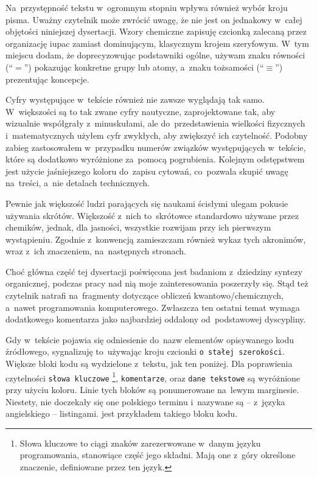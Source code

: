 Na~przystępność tekstu w~ogromnym stopniu wpływa również wybór kroju pisma.
Uważny czytelnik może zwrócić uwagę, że nie jest on jednakowy w~całej objętości
  niniejszej dysertacji.
Wzory chemiczne zapisuję czcionką zalecaną przez organizację \gls{iupac}
  zamiast dominującym, klasycznym krojem szeryfowym.
W~tym miejscu dodam, że doprecyzowując podstawniki ogólne,
  używam znaku równości (\enquote{$=$}) pokazując konkretne grupy lub atomy,
  a~znaku tożsamości (\enquote{$\equiv$}) prezentując koncepcje.

Cyfry występujące w~tekście również nie zawsze wyglądają tak samo.
W~większości są to tak zwane cyfry nautyczne, zaprojektowane tak, aby wizualnie współgrały
  z~minuskułami,
  ale do~przedstawienia wielkości fizycznych i~matematycznych użyłem cyfr zwykłych,
  aby zwiększyć ich czytelność.
Podobny zabieg zastosowałem w~przypadku numerów związków występujących w~tekście,
  które są dodatkowo wyróżnione za~pomocą pogrubienia.
Kolejnym odstępstwem jest użycie jaśniejszego koloru do~zapisu cytowań,
  co~pozwala skupić uwagę na~treści, a~nie detalach technicznych.

Pewnie jak większość ludzi parających się naukami ścisłymi ulegam pokusie używania skrótów.
Większość z~nich to~skrótowce standardowo używane przez chemików,
  jednak, dla jasności, wszystkie rozwijam przy ich pierwszym wystąpieniu.
Zgodnie z~konwencją zamieszczam również wykaz tych akronimów,
  wraz z~ich znaczeniem, na~następnych stronach.

Choć główna część tej dysertacji poświęcona jest badaniom z~dziedziny syntezy organicznej,
  podczas pracy nad nią moje zainteresowania poszerzyły się.
Stąd też czytelnik natrafi na~fragmenty dotyczące obliczeń kwantowo\-/chemicznych,
  a~nawet programowania komputerowego.
Zwłaszcza ten ostatni temat wymaga dodatkowego komentarza jako najbardziej oddalony
  od~podstawowej dyscypliny.

Gdy w~tekście pojawia się odniesienie do~nazw elementów opisywanego kodu źródłowego,
  sygnalizuję to~używając kroju czcionki \lstinline!o stałej szerokości!.
Większe bloki kodu są wydzielone z~tekstu, jak ten poniżej.
Dla poprawienia czytelności 
  \lstinline[basicstyle=\ttfamily\color{wongvermillion},columns=fixed]!słowa kluczowe!%
  \footnote{
    Słowa kluczowe to ciągi znaków zarezerwowane w~danym języku programowania,
      stanowiące część jego składni.
    Mają one z~góry określone znaczenie, definiowane przez ten język.
  },
  \lstinline[basicstyle=\ttfamily\color{wongsky},columns=fixed]!komentarze!, oraz 
  \lstinline[basicstyle=\ttfamily\color{wonggreen},columns=fixed]!dane tekstowe!
  są wyróżnione przy użyciu koloru.
Linie tych bloków są ponumerowane na~lewym marginesie.
Niestety, nie doczekały się one polskiego terminu i~nazywane są \--- 
  z~języka angielskiego \--- listingami.
 jest przykładem takiego bloku kodu.

